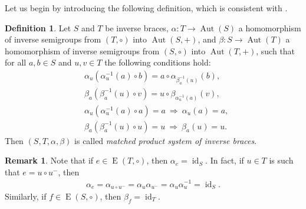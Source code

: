 \documentclass[preprint,1p]{elsarticle}
\theoremstyle{definition}               %
\newtheorem{defin}[theor]{Definition}
\newtheorem{rem}[theor]{Remark}
\DeclareMathOperator{\Aut}{Aut}
\DeclareMathOperator{\id}{id}
\DeclareMathOperator{\E}{E}
\begin{document}
Let us begin by introducing the following definition, which is consistent with \cite[Definition 17]{CaMaMiSt22}.
\begin{defin}\label{def_matched}
Let $S$ and $T$ be inverse braces, $\alpha:T\rightarrow \Aut(S)$ a homomorphism of inverse semigroups from $(T,\circ)$ into $\Aut(S,+)$, 
and $\beta:S\rightarrow \Aut(T)$ a homomorphism of inverse semigroups from $(S,\circ)$ into $\Aut(T,+)$,
such that for all $a,b \in S$ and $u,v \in T$ the following conditions hold:
\begin{align*}
    &\alpha_u\left(\alpha_u^{-1} (a)\circ b\right)= a\circ \alpha_{\beta_{a}^{-1}(u)}(b),\\
 &\beta_a\left(\beta_a^{-1}(u)\circ v\right)= u\circ \beta_{\alpha_{u}^{-1}(a)} (v),\\
&\alpha_u\left(\alpha_u^{-1} (a)\circ a\right)= a\ \Rightarrow \ \alpha_u(a)=a,\\
&  \beta_a\left(\beta_a^{-1}(u)\circ u\right)=u\ \Rightarrow \  \beta_a(u)=u.
\end{align*}
Then $(S, T,\alpha,\beta)$ is called \emph{matched product system of inverse braces}.
\end{defin}


\smallskip

\begin{rem}\label{rem:idemp-alpha-beta}
   Note that if $e\in \E(T, \circ)$, then $\alpha_{e} = \id_S$.
    In fact, if $u\in T$ is such that $e = u\circ u^{-}$, then
    \begin{align*}
        \alpha_{e}
        = \alpha_{u\circ u^{-}}
        = \alpha_{u}\alpha_{u^{-}}
        = \alpha_{u}\alpha^{-1}_{u}=\id_S.
    \end{align*}
Similarly, if $f\in \E(S, \circ )$, then $\beta_{f} = \id_T$.
   \end{rem}

   \smallskip
\end{document}
